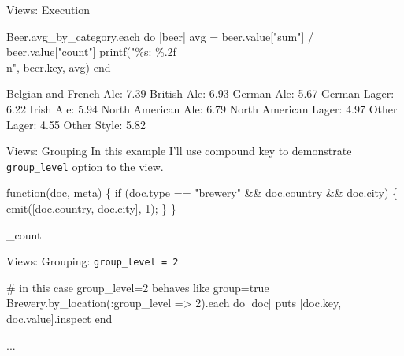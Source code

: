 \documentclass[aspectratio=43]{beamer}
\begin{document}
\begin{frame}[fragile]{Views: Execution}
  \begin{semiverbatim}
  Beer.avg_by_category.each do |beer|
    avg = beer.value["sum"] / beer.value["count"]
    printf("\alert<3>{\%s}: \alert<4>{\%.2f}\\n", \alert<3>{beer.key}, \alert<4>{avg})
  end
  \end{semiverbatim}

  \pause
  \begin{semiverbatim}
  \alert<3>{Belgian and French Ale}: \alert<4>{7.39}
  \alert<3>{British Ale}: \alert<4>{6.93}
  \alert<3>{German Ale}: \alert<4>{5.67}
  \alert<3>{German Lager}: \alert<4>{6.22}
  \alert<3>{Irish Ale}: \alert<4>{5.94}
  \alert<3>{North American Ale}: \alert<4>{6.79}
  \alert<3>{North American Lager}: \alert<4>{4.97}
  \alert<3>{Other Lager}: \alert<4>{4.55}
  \alert<3>{Other Style}: \alert<4>{5.82}
  \end{semiverbatim}
\end{frame}

\begin{frame}[fragile]{Views: Grouping}
  In this example I'll use compound key to demonstrate
  \texttt{group\_level} option to the view.

  \begin{semiverbatim}
  \pause
  function(doc, meta) \{
    if (doc.type == "brewery" \&\& doc.country \&\& doc.city) \{
      emit(\alert<4>{[doc.country, doc.city]}, 1);
    \}
  \}
  \pause

  \_count
  \end{semiverbatim}
\end{frame}

\begin{frame}[fragile]{Views: Grouping: \texttt{group\_level = 2}}
  \begin{semiverbatim}
  # in this case group_level=2 behaves like group=true
  Brewery.by_location(\alert<3>{:group_level => 2}).each do |doc|
    puts [\alert<3>{doc.key}, doc.value].inspect
  end
  \end{semiverbatim}

  \pause

  \begin{semiverbatim}
  ...
  \end{semiverbatim}
\end{frame}
\end{document}
